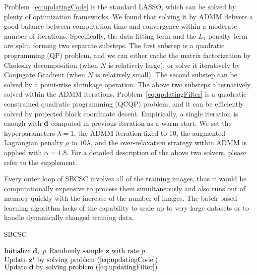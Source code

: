 Problem~\ref{eq:updatingCode} is the standard LASSO, which can be solved by plenty of optimization frameworks. We found that solving it by ADMM delivers a good balance 
between computation time and convergence within a moderate number of iterations. Specifically, the data fitting term and the $L_1$ penalty term are split, forming two 
separate substeps. The first substep is a quadratic programming (QP) problem, and we can either cache the matrix factorization by Cholesky decomposition 
(when $N$ is relatively large), or solve it iteratively by Conjugate Gradient (when $N$ is relatively small). The second substep can be solved by a point-wise
 shrinkage operation. The above two substeps alternatively solved within the ADMM iterations. Problem~\ref{eq:updatingFilter} is a quadratic 
constrained quadratic programming (QCQP) problem, and it can be efficiently solved by projected block coordinate decent. Empirically, a single iteration is enough with $\filter$ computed in previous iteration as a warm start. We set the hyperparameters $\lambda=1$, the ADMM iteration fixed to 10, the augmented Lagrangian penalty $\rho$ to $10 \lambda$, and the over-relaxation strategy within ADMM is applied with $\alpha = 1.8$. For a detailed description of the above two solvers, please refer to the supplement.

Every outer loop of SBCSC involves all of the training images, thus it would be computationally expensive to process them simultaneously and also runs out of memory quickly with the increase of the number of images. The batch-based learning algorithm lacks of the capability to scale up to very large datasets or to handle dynamically changed training data.

\begin{algorithm}[H]
\caption{SBCSC} \label{algo:SBCSC}
\begin{algorithmic}[1]
\State $\text{Initialize } \filter, ~p$
    \State $ \text{Randomly sample }\code \text{ with rate } p $
        \State $ \text{Update } \code^i \text{ by solving problem~(\ref{eq:updatingCode}})$
    \EndFor
    \State $\text{Update } \filter \text{ by solving problem~(\ref{eq:updatingFilter}})$
\EndWhile
\end{algorithmic}
\end{algorithm}

